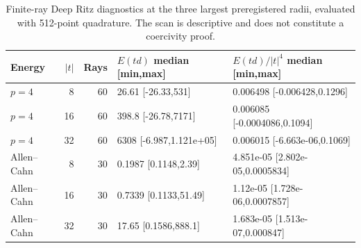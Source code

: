 \begin{table}[t]
\centering
\scriptsize
\setlength{\tabcolsep}{3pt}
\renewcommand{\arraystretch}{1.12}
\begin{tabular}{@{}lrrp{}p{}@{}}
\hline
Energy & $|t|$ & Rays & $E(td)$ median [min,max] & $E(td)/|t|^4$ median [min,max] \\
\hline
$p=4$ & 8 & 60 & 26.61 [-26.33,531] & 0.006498 [-0.006428,0.1296] \\
$p=4$ & 16 & 60 & 398.8 [-26.78,7171] & 0.006085 [-0.0004086,0.1094] \\
$p=4$ & 32 & 60 & 6308 [-6.987,1.121e+05] & 0.006015 [-6.663e-06,0.1069] \\
Allen--Cahn & 8 & 30 & 0.1987 [0.1148,2.39] & 4.851e-05 [2.802e-05,0.0005834] \\
Allen--Cahn & 16 & 30 & 0.7339 [0.1133,51.49] & 1.12e-05 [1.728e-06,0.0007857] \\
Allen--Cahn & 32 & 30 & 17.65 [0.1586,888.1] & 1.683e-05 [1.513e-07,0.000847] \\
\hline
\end{tabular}
\caption{Finite-ray Deep Ritz diagnostics at the three largest preregistered radii, evaluated with 512-point quadrature. The scan is descriptive and does not constitute a coercivity proof.}
\label{tab:radial-energy}
\end{table}
